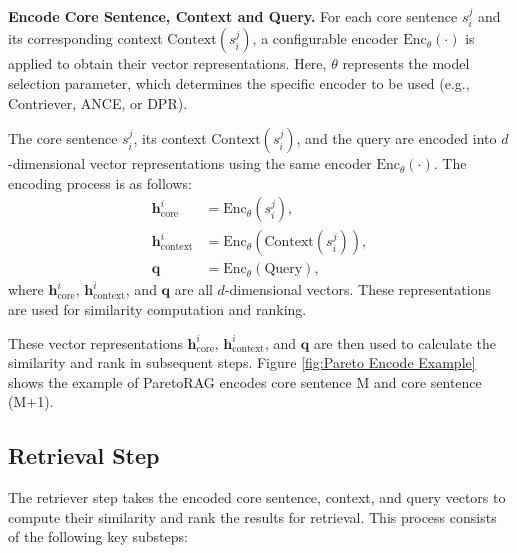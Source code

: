 \textbf{Encode Core Sentence, Context and Query. }For each core sentence $s_i^j$ and its corresponding context $\text{Context}(s_i^j)$, a configurable encoder $\text{Enc}_\theta(\cdot)$ is applied to obtain their vector representations. Here, $\theta$ represents the model selection parameter, which determines the specific encoder to be used (e.g., Contriever, ANCE, or DPR). 


The core sentence $s_i^j$, its context $\text{Context}(s_i^j)$, and the query are encoded into $d$-dimensional vector representations using the same encoder $\text{Enc}_\theta(\cdot)$. The encoding process is as follows:
\[
\begin{aligned}
\mathbf{h}_{\text{core}}^i &= \text{Enc}_\theta(s_i^j), \\
\mathbf{h}_{\text{context}}^i &= \text{Enc}_\theta(\text{Context}(s_i^j)), \\
\mathbf{q} &= \text{Enc}_\theta(\text{Query}),
\end{aligned}
\]
where $\mathbf{h}_{\text{core}}^i$, $\mathbf{h}_{\text{context}}^i$, and $\mathbf{q}$ are all $d$-dimensional vectors. These representations are used for similarity computation and ranking.

These vector representations $\mathbf{h}_{\text{core}}^i$, $\mathbf{h}_{\text{context}}^i$, and $\mathbf{q}$ are then used to calculate the similarity and rank in subsequent steps. Figure \ref{fig:Pareto Encode Example} shows the example of ParetoRAG encodes core sentence M and core sentence (M+1). 


\subsection{Retrieval Step}
The retriever step takes the encoded core sentence, context, and query vectors to compute their similarity and rank the results for retrieval. This process consists of the following key substeps:

